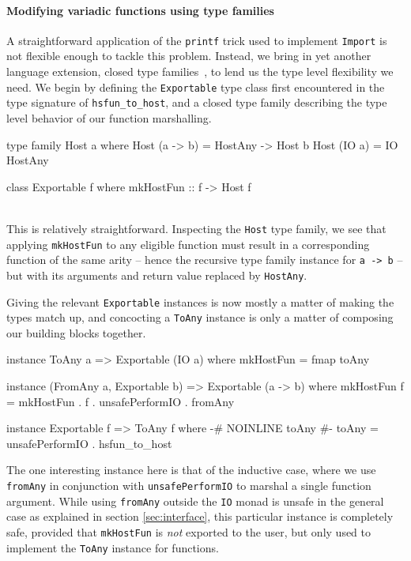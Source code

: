 \documentclass[preprint]{sigplanconf}
\begin{document}
\paragraph{Modifying variadic functions using type families}
A straightforward application of the \lstinline!printf! trick used to
implement \lstinline!Import! is not flexible
enough to tackle this problem. Instead, we bring in yet another language
extension, closed type families\ \cite{closedtypefamilies}, to lend us the type
level flexibility we need. We begin by defining the \lstinline!Exportable!
type class first encountered in the type signature of \lstinline!hsfun_to_host!,
and a closed type family describing the type level behavior of our function
marshalling.\\
\begin{code}
  type family Host a where
    Host (a -> b) = HostAny -> Host b
    Host (IO a)   = IO HostAny

  class Exportable f where
    mkHostFun :: f -> Host f
\end{code}\\
This is relatively straightforward. Inspecting the \lstinline!Host! type
family, we see that applying \lstinline!mkHostFun! to any eligible function
must result in a corresponding function of the same arity -- hence the
recursive type family instance for \lstinline!a -> b! -- but with its
arguments and return value replaced by \lstinline!HostAny!.

Giving the relevant \lstinline!Exportable! instances is now mostly a matter of
making the types match up, and concocting a \lstinline!ToAny! instance is only
a matter of composing our building blocks together.

\begin{code}
  instance ToAny a => Exportable (IO a) where
    mkHostFun = fmap toAny

  instance (FromAny a, Exportable b) =>
            Exportable (a -> b) where
    mkHostFun f =
      mkHostFun . f . unsafePerformIO . fromAny
  
  instance Exportable f => ToAny f where
    {-# NOINLINE toAny #-}
    toAny = unsafePerformIO . hsfun_to_host
\end{code}

The one interesting instance here is that of the inductive case, where we use
\lstinline!fromAny! in conjunction with \lstinline!unsafePerformIO! to marshal
a single function argument. While using \lstinline!fromAny! outside the
\lstinline!IO! monad is unsafe in the general case as explained in section
\ref{sec:interface}, this particular instance is completely safe, provided that
\lstinline!mkHostFun! is \emph{not} exported to the user, but only used to
implement the \lstinline!ToAny! instance for functions.
\end{document}
